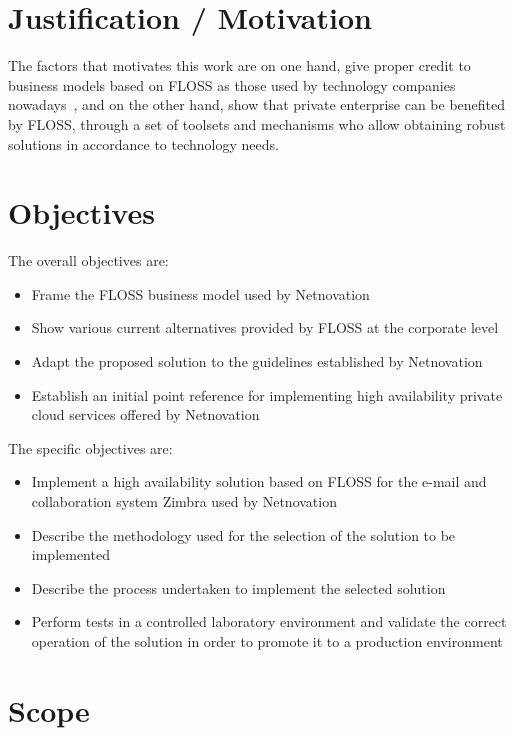 \documentclass[a4paper, 12pt]{book}
\begin{document}
\section{Justification / Motivation}
\label{sec:justification}


The factors that motivates this work are on one hand, give proper credit to business models based on FLOSS as those used by technology companies nowadays~\cite{Daffara Eco}, and on the other hand, show that private enterprise can be benefited by FLOSS, through a set of toolsets and mechanisms who allow obtaining robust solutions in accordance to technology needs.

\section{Objectives}
\label{sec:objectives}

The overall objectives are:

\begin{itemize}
	\item Frame the FLOSS business model used by Netnovation
	\item Show various current alternatives provided by FLOSS at the corporate level
	\item Adapt the proposed solution to the guidelines established by Netnovation
	\item Establish an initial point reference for implementing high availability private cloud services offered by Netnovation
\end{itemize}

\noindent The specific objectives are:

\begin{itemize}
	\item Implement a high availability solution based on FLOSS for the e-mail and collaboration system Zimbra used by Netnovation
	\item Describe the methodology used for the selection of the solution to be implemented
	\item Describe the process undertaken to implement the selected solution
	\item Perform tests in a controlled laboratory environment and validate the correct operation of the solution in order to promote it to a production environment
\end{itemize}


\section{Scope}
\label{sec:scope}
\end{document}
